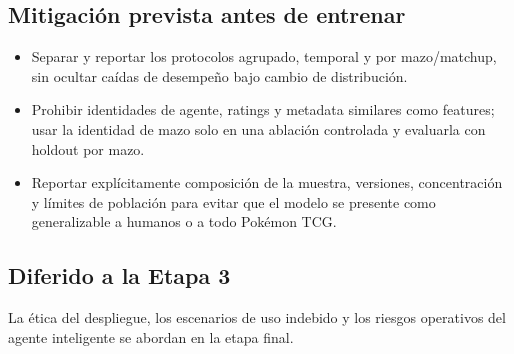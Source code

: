\subsection{Mitigación prevista antes de entrenar}
\label{subsec:mitigacionetica}
\begin{itemize}
  \item Separar y reportar los protocolos agrupado, temporal y por
  mazo/matchup, sin ocultar caídas de desempeño bajo cambio de
  distribución.
  \item Prohibir identidades de agente, ratings y metadata similares
  como features; usar la identidad de mazo solo en una ablación
  controlada y evaluarla con holdout por mazo.
  \item Reportar explícitamente composición de la muestra, versiones,
  concentración y límites de población para evitar que el modelo se
  presente como generalizable a humanos o a todo Pokémon TCG.
\end{itemize}

\subsection{Diferido a la Etapa 3}
\label{subsec:diferido}
La ética del despliegue, los escenarios de uso indebido y los riesgos
operativos del agente inteligente se abordan en la etapa final.
